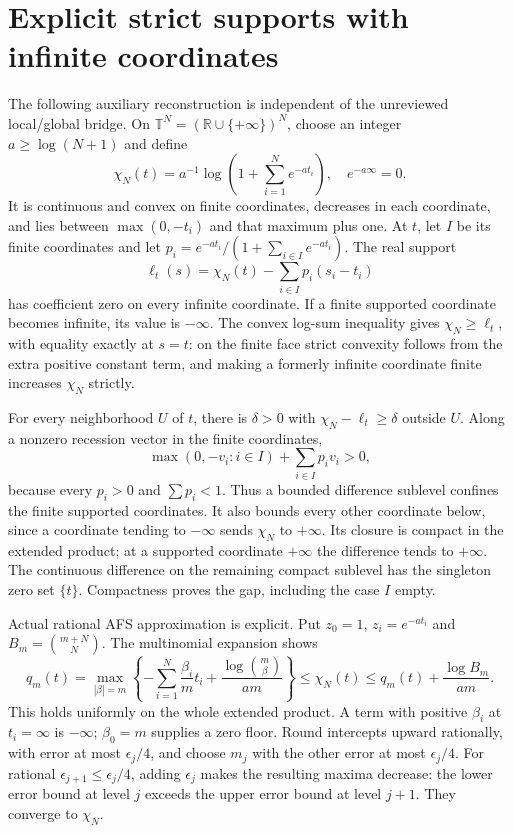 \documentclass[
  10pt,
]{article}
\begin{document}
\section{Explicit strict supports with infinite
coordinates}\label{explicit-strict-supports-with-infinite-coordinates}

The following auxiliary reconstruction is independent of the unreviewed
local/global bridge. On \(\mathbb T^N=(\mathbb R\cup\{+\infty\})^N\),
choose an integer \(a\ge\log(N+1)\) and define
\[\chi_N(t)=a^{-1}\log\left(1+\sum_{i=1}^Ne^{-at_i}\right),\quad e^{-a\infty}=0. \tag{38}\]
It is continuous and convex on finite coordinates, decreases in each
coordinate, and lies between \(\max(0,-t_i)\) and that maximum plus one.
At \(t\), let \(I\) be its finite coordinates and let
\(p_i=e^{-at_i}/(1+\sum_{i\in I}e^{-at_i})\). The real support
\[\ell_t(s)=\chi_N(t)-\sum_{i\in I}p_i(s_i-t_i) \tag{39}\] has
coefficient zero on every infinite coordinate. If a finite supported
coordinate becomes infinite, its value is \(-\infty\). The convex
log-sum inequality gives \(\chi_N\ge\ell_t\), with equality exactly at
\(s=t\): on the finite face strict convexity follows from the extra
positive constant term, and making a formerly infinite coordinate finite
increases \(\chi_N\) strictly.

For every neighborhood \(U\) of \(t\), there is \(\delta>0\) with
\(\chi_N-\ell_t\ge\delta\) outside \(U\). Along a nonzero recession
vector in the finite coordinates,
\[\max(0,-v_i:i\in I)+\sum_{i\in I}p_iv_i>0,\] because every \(p_i>0\)
and \(\sum p_i<1\). Thus a bounded difference sublevel confines the
finite supported coordinates. It also bounds every other coordinate
below, since a coordinate tending to \(-\infty\) sends \(\chi_N\) to
\(+\infty\). Its closure is compact in the extended product; at a
supported coordinate \(+\infty\) the difference tends to \(+\infty\).
The continuous difference on the remaining compact sublevel has the
singleton zero set \(\{t\}\). Compactness proves the gap, including the
case \(I\) empty.

Actual rational AFS approximation is explicit. Put \(z_0=1\),
\(z_i=e^{-at_i}\) and \(B_m={m+N\choose N}\). The multinomial expansion
shows \[
 q_m(t)=\max_{|\beta|=m}\left\{-\sum_{i=1}^N\frac{\beta_i}{m}t_i
          +\frac{\log{m\choose\beta}}{am}\right\}
 \le\chi_N(t)\le q_m(t)+\frac{\log B_m}{am}. \tag{40}
\] This holds uniformly on the whole extended product. A term with
positive \(\beta_i\) at \(t_i=\infty\) is \(-\infty\); \(\beta_0=m\)
supplies a zero floor. Round intercepts upward rationally, with error at
most \(\epsilon_j/4\), and choose \(m_j\) with the other error at most
\(\epsilon_j/4\). For rational \(\epsilon_{j+1}\le\epsilon_j/4\), adding
\(\epsilon_j\) makes the resulting maxima decrease: the lower error
bound at level \(j\) exceeds the upper error bound at level \(j+1\).
They converge to \(\chi_N\).
\end{document}
